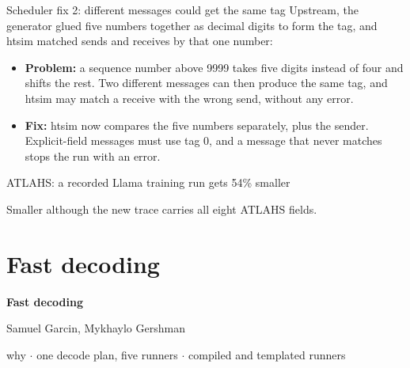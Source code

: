 \documentclass[aspectratio=169,11pt]{beamer}
\newcommand{\highlight}[1]{\colorbox{cream}{\parbox{\dimexpr\linewidth-2\fboxsep}{\small #1}}}
\begin{document}
\begin{frame}{Scheduler fix 2: different messages could get the same tag}
\small
Upstream, the generator glued five numbers together as decimal digits to form the tag, and htsim matched sends and receives by that one number:
\vspace{3mm}

\centering

\par\raggedright
\vspace{3mm}
\begin{itemize}
\item \textbf{Problem:} a sequence number above 9999 takes five digits instead of four and shifts the rest. Two different messages can then produce the same tag, and htsim may match a receive with the wrong send, without any error.
\item \textbf{Fix:} htsim now compares the five numbers separately, plus the sender. Explicit-field messages must use tag 0, and a message that never matches stops the run with an error.
\end{itemize}
\end{frame}

\begin{frame}{ATLAHS: a recorded Llama training run gets 54\% smaller}
\centering\vfill
{}
\vfill
\par\raggedright
\highlight{Smaller although the new trace carries all eight ATLAHS fields.}
\end{frame}

\section{Fast decoding}

\begin{frame}
\centering\vfill
{\Huge\bfseries Fast decoding\par}
\vspace{4mm}
{\large Samuel Garcin, Mykhaylo Gershman\par}
\vspace{3mm}
{\small\color{black!60}why $\cdot$ one decode plan, five runners $\cdot$ compiled and templated runners\par}
\vfill
\end{frame}
\end{document}
